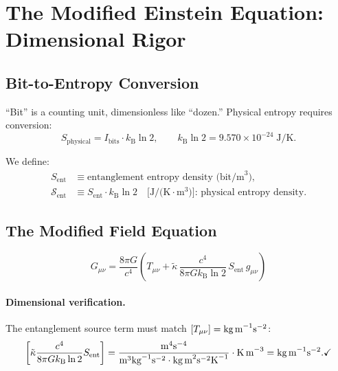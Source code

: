 \documentclass[12pt,letterpaper]{article}
\theoremstyle{plain}
\theoremstyle{definition}
\theoremstyle{remark}
\newcommand{\kB}{k_{\mathrm{B}}}
\newcommand{\lnTwo}{\ln 2}
\newcommand{\kt}{\tilde{\kappa}}
\newcommand{\Sent}{S_{\mathrm{ent}}}
\begin{document}
\section{The Modified Einstein Equation: Dimensional Rigor}
\label{sec:theory}

\subsection{Bit-to-Entropy Conversion}

``Bit'' is a counting unit, dimensionless like ``dozen.''  Physical entropy requires
conversion:
\begin{equation}
  S_{\mathrm{physical}} = I_{\mathrm{bits}}\cdot\kB\lnTwo,
  \qquad
  \kB\lnTwo = 9.570\times10^{-24}\;\text{J/K}.
  \label{eq:conversion}
\end{equation}

We define:
\begin{align}
  \Sent &\equiv \text{entanglement entropy density (bit/m}^{3}\text{),} \\
  \mathcal{S}_{\mathrm{ent}} &\equiv \Sent\cdot\kB\lnTwo \quad
    \text{[J/(K$\cdot$m$^{3}$)]:\ physical entropy density.}
\end{align}

\subsection{The Modified Field Equation}
\label{ssec:field-eq}

\begin{equation}
  \boxed{
  G_{\mu\nu}
  = \frac{8\pi G}{c^{4}}
    \!\left(
      T_{\mu\nu}
      + \kt\,\frac{c^{4}}{8\pi G\kB\lnTwo}\,\Sent\,g_{\mu\nu}
    \right)}
  \label{eq:modified-einstein}
\end{equation}

\paragraph{Dimensional verification.}
The entanglement source term must match $[T_{\mu\nu}] = \text{kg\,m}^{-1}\text{s}^{-2}$:
\begin{equation}
  \left[\kt\frac{c^{4}}{8\pi G\kB\lnTwo}\Sent\right]
  = \frac{\text{m}^{4}\text{s}^{-4}}
         {\text{m}^{3}\text{kg}^{-1}\text{s}^{-2}
          \cdot\text{kg\,m}^{2}\text{s}^{-2}\text{K}^{-1}}
    \cdot\text{K\,m}^{-3}
  = \text{kg\,m}^{-1}\text{s}^{-2}. \checkmark
  \label{eq:dim-check}
\end{equation}
\end{document}
